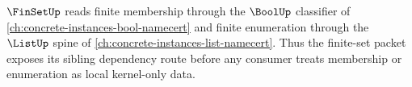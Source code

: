 $\FinSetUp$ reads finite membership through the $\BoolUp$ classifier of \autoref{ch:concrete-instances-bool-namecert} and finite enumeration through the $\ListUp$ spine of \autoref{ch:concrete-instances-list-namecert}. Thus the finite-set packet exposes its sibling dependency route before any consumer treats membership or enumeration as local kernel-only data.
